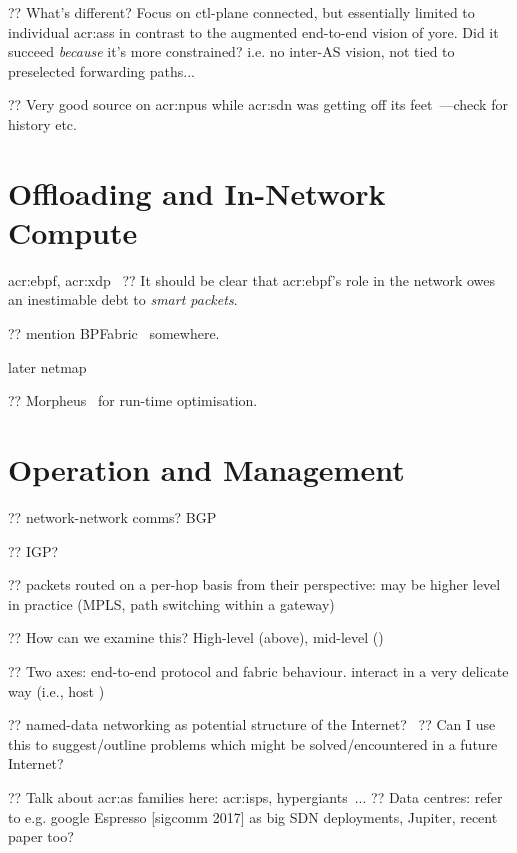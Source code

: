 ?? What's different? Focus on ctl-plane connected, but essentially limited to individual \glspl{acr:as} in contrast to the augmented end-to-end vision of yore. Did it succeed \emph{because} it's more constrained? i.e. no inter-AS vision, not tied to preselected forwarding paths...

?? Very good source on \glspl{acr:npu} while \gls{acr:sdn} was getting off its feet~\parencite{npu-book}---check for history etc.


\section{Offloading and In-Network Compute}

\gls{acr:ebpf}, \gls{acr:xdp}~\parencite{DBLP:conf/conext/Hoiland-Jorgensen18}
?? It should be clear that \gls{acr:ebpf}'s role in the network owes an inestimable debt to \emph{smart packets}.

?? mention BPFabric~\parencite{DBLP:conf/ancs/JouetP17} somewhere.

later netmap~\parencite{DBLP:conf/usenix/Rizzo12}

?? Morpheus~\parencite{miano-morpheus} for run-time optimisation.

\section{Operation and Management}

?? network-network comms? BGP

?? IGP?

?? packets routed on a per-hop basis from their perspective: may be higher level in practice (MPLS, path switching within a gateway)

?? How can we examine this? High-level (above), mid-level ()

?? Two axes: end-to-end protocol and fabric behaviour. interact in a very delicate way (i.e., host )

?? named-data networking as potential structure of the Internet?~\parencite{DBLP:journals/ccr/0001ABJcCPWZ14}
?? Can I use this to suggest/outline problems which might be solved/encountered in a future Internet?

?? Talk about \gls{acr:as} families here: \glspl{acr:isp}, hypergiants~\parencite{DBLP:conf/sigcomm/GigisCMNKDKS21}...
?? Data centres: refer to e.g. google Espresso [sigcomm 2017] as big SDN deployments, Jupiter, recent paper too?

